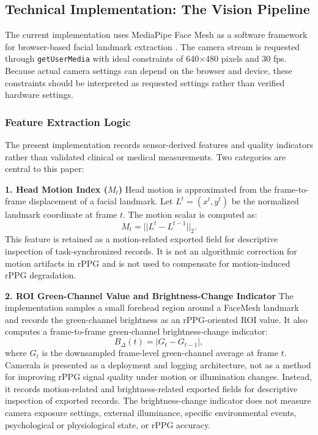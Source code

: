 \documentclass[dvipdfmx]{ehis}
\begin{document}
\subsection{Technical Implementation: The Vision Pipeline}
The current implementation uses MediaPipe Face Mesh as a software framework for browser-based facial landmark extraction \cite{mediapipe_framework}.
The camera stream is requested through \texttt{getUserMedia} with ideal constraints of 640$\times$480 pixels and 30 fps.
Because actual camera settings can depend on the browser and device, these constraints should be interpreted as requested settings rather than verified hardware settings.

\subsubsection{Feature Extraction Logic}
The present implementation records sensor-derived features and quality indicators rather than validated clinical or medical measurements.
Two categories are central to this paper:

\textbf{1. Head Motion Index ($M_t$)}
Head motion is approximated from the frame-to-frame displacement of a facial landmark.
Let $L^t = (x^t, y^t)$ be the normalized landmark coordinate at frame $t$.
The motion scalar is computed as:
\begin{equation}
    M_t = || L^t - L^{t-1} ||_2 .
\end{equation}
This feature is retained as a motion-related exported field for descriptive inspection of task-synchronized records.
It is not an algorithmic correction for motion artifacts in rPPG and is not used to compensate for motion-induced rPPG degradation.

\textbf{2. ROI Green-Channel Value and Brightness-Change Indicator}
The implementation samples a small forehead region around a FaceMesh landmark and records the green-channel brightness as an rPPG-oriented ROI value.
It also computes a frame-to-frame green-channel brightness-change indicator:
\begin{equation}
    B_{\Delta}(t) = | G_t - G_{t-1} | ,
\end{equation}
where $G_t$ is the downsampled frame-level green-channel average at frame $t$.
Camerala is presented as a deployment and logging architecture, not as a method for improving rPPG signal quality under motion or illumination changes.
Instead, it records motion-related and brightness-related exported fields for descriptive inspection of exported records.
The brightness-change indicator does not measure camera exposure settings, external illuminance, specific environmental events, psychological or physiological state, or rPPG accuracy.
\end{document}
